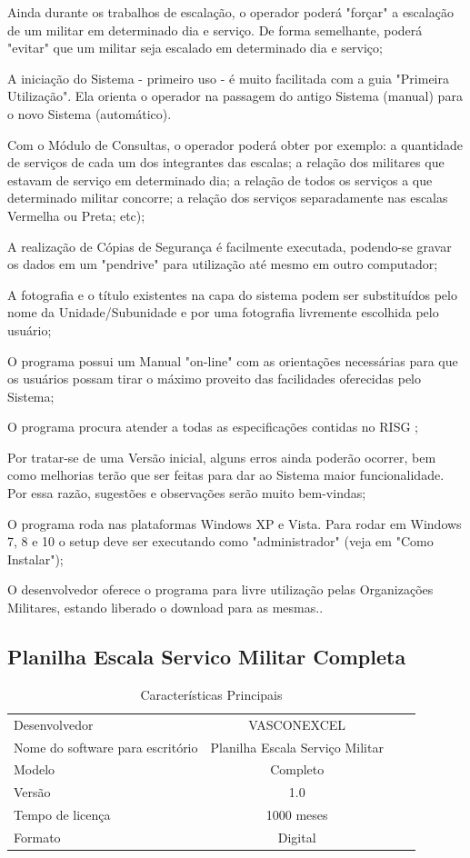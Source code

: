 Ainda durante os trabalhos de escalação, o operador poderá "forçar" a escalação de um militar em determinado dia e serviço. De forma semelhante, poderá "evitar" que um militar seja escalado em determinado dia e serviço;

A iniciação do Sistema - primeiro uso - é muito facilitada com a guia "Primeira Utilização". Ela orienta o operador na passagem do antigo Sistema (manual) para o novo Sistema (automático).

Com o Módulo de Consultas, o operador poderá obter por exemplo: a quantidade de serviços de cada um dos integrantes das escalas; a relação dos militares que estavam de serviço em determinado dia; a relação de todos os serviços a que determinado militar concorre; a relação dos serviços separadamente nas escalas Vermelha ou Preta; etc);

A realização de Cópias de Segurança é facilmente executada, podendo-se gravar os dados em um "pendrive" para utilização até mesmo em outro computador;

A fotografia e o título existentes na capa do sistema podem ser substituídos pelo nome da Unidade/Subunidade e por uma fotografia livremente escolhida pelo usuário;

O programa possui um Manual "on-line" com as orientações necessárias para que os usuários possam tirar o máximo proveito das facilidades oferecidas pelo Sistema;

O programa procura atender a todas as especificações contidas no RISG ;

Por tratar-se de uma Versão inicial, alguns erros ainda poderão ocorrer, bem como melhorias terão que ser feitas para dar ao Sistema maior funcionalidade. Por essa razão, sugestões e observações serão muito bem-vindas;

O programa roda nas plataformas Windows XP e Vista. Para rodar em Windows 7, 8 e 10 o setup deve ser executando como "administrador" (veja em "Como Instalar");

O desenvolvedor oferece o programa para livre utilização pelas Organizações Militares, estando liberado o download para as mesmas.\citep{eloy}.

\subsection{Planilha Escala Servico Militar Completa}

\begin{table}[htb]
\caption{Características Principais}
\label{tb:exemplo}
\centering
\begin{tabular}{|l|c|r|r|} %
\hline
Desenvolvedor & VASCONEXCEL\\
Nome do software para escritório & Planilha Escala Serviço Militar\\
Modelo & Completo\\
Versão & 1.0 \\
Tempo de licença & 1000 meses \\
Formato	& Digital \\
\hline
\end{tabular}
\end{table}

